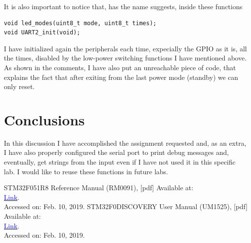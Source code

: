\documentclass[peerreview]{IEEEtran}
\begin{document}
It is also important to notice that, has the name suggests, inside these functions
\begin{lstlisting}[style=CStyle]
void led_modes(uint8_t mode, uint8_t times);
void UART2_init(void);
\end{lstlisting}
I have initialized again the peripherals each time, expecially the GPIO as it is, all the times, disabled by the low-power switching functions I have mentioned above.\\
As shown in the comments, I have also put an unreachable piece of code, that explains the fact that after exiting from the last power mode (standby) we can only reset.
\label{tab:template}

\section{Conclusions}
In this discussion I have accomplished the assignment requested and, as an extra, I have also properly configured the serial port to print debug messages and, eventually, get strings from the input even if I have not used it in this specific lab. I would like to reuse these functions in future labs.

\begin{thebibliography}{1}
STM32F051R8 Reference Manual (RM0091), [pdf] Available at:\\ \href{https://www.st.com/content/ccc/resource/technical/document/reference_manual/c2/f8/8a/f2/18/e6/43/96/DM00031936.pdf/files/DM00031936.pdf/jcr:content/translations/en.DM00031936.pdf}{\underline{\textcolor{blue}{Link}}}.\\Accessed on: Feb. 10, 2019.
STM32F0DISCOVERY User Manual (UM1525), [pdf] Available at:\\ \href{https://www.st.com/content/ccc/resource/technical/document/user_manual/30/ae/6e/54/d3/b6/46/17/DM00050135.pdf/files/DM00050135.pdf/jcr:content/translations/en.DM00050135.pdf}{\underline{\textcolor{blue}{Link}}}.\\Accessed on: Feb. 10, 2019.
\end{thebibliography}
\end{document}
